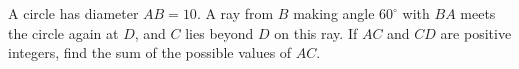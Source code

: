 A circle has diameter $AB=10$. A ray from $B$ making angle $60^\circ$ with $BA$ meets the circle again at $D$, and $C$ lies beyond $D$ on this ray. If $AC$ and $CD$ are positive integers, find the sum of the possible values of $AC$.
